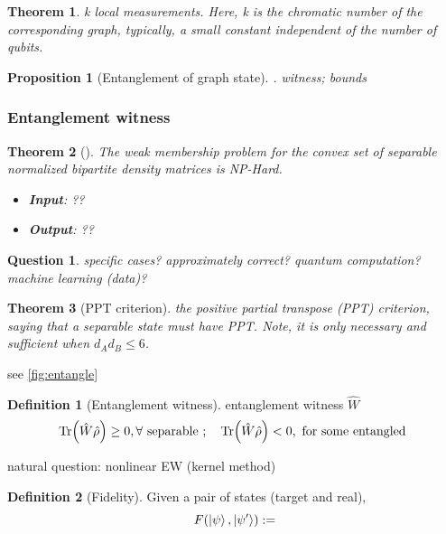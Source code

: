 \documentclass[
aps,
pra,
linenumbers,
floatfix,
]{revtex4-2}
\theoremstyle{plain}
\newtheorem{theorem}{Theorem}
\newtheorem{proposition}{Proposition}
\newtheorem{question}{Question}
\theoremstyle{definition}
\newtheorem{definition}{Definition}
\newcommand{\ew}{\hat{W}}
\newcommand{\dm}{\hat{\rho}}
\begin{document}
\begin{theorem}
	k local measurements. Here, k is the chromatic number of the corresponding graph, typically, a small constant independent of the number of qubits.
\end{theorem}
\begin{proposition}[Entanglement of graph state]
	\cite{heinEntanglementGraphStates2006}.
	witness; bounds
\end{proposition}

\subsubsection{Entanglement witness}
\begin{theorem}[\cite{gurvitsClassicalDeterministicComplexity2003}]
	The weak membership problem for the convex set of separable normalized bipartite density matrices is NP-Hard.
	\begin{itemize}
		\item \textbf{Input}: ??
		\item \textbf{Output}: ??
	\end{itemize}
\end{theorem}
\begin{question}
	specific cases? approximately correct? quantum computation? machine learning (data)?
\end{question}
\begin{theorem}[PPT criterion]
	the positive partial transpose (PPT) criterion, saying that a separable state must have PPT.
	Note, it is only necessary and sufficient when $d_A d_B \le 6$.
\end{theorem}
see \cref{fig:entangle}
\begin{definition}[Entanglement witness]
	entanglement witness $\ew$
	\begin{equation}
		\Tr(\ew\dm) \ge 0 , \forall \text{ separable };\quad
		\Tr(\ew\dm) < 0 , \text{ for some entangled }
	\end{equation}
\end{definition}
natural question: nonlinear EW \cite{guhneNonlinearEntanglementWitnesses2006} (kernel method)
\begin{definition}[Fidelity]\label{def:fidelity}
	Given a pair of states (target and real), 
	\begin{equation}
		F(\ket{\psi},\ket{\psi'}) :=
	\end{equation}
\end{definition}
\end{document}
